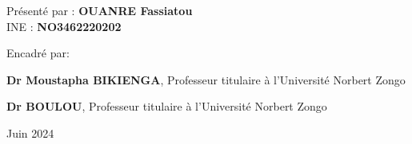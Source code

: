 \begin{titlepage}
\begin{center}
\vspace{30pt}

{\fontsize{16}{1}\selectfont Présenté par : \textbf{OUANRE Fassiatou}} \\

\vspace{0.6 cm}
 INE : \textbf{NO3462220202}
\end{center}

\vspace{30pt}
{\fontsize{16}{1}\selectfont Encadré par:}\\
\vspace{2pt}

{\fontsize{14}{1}\selectfont \textbf{Dr Moustapha BIKIENGA}}, Professeur titulaire à l'Université Norbert Zongo\\
\vspace{2pt}

{\fontsize{14}{1}\selectfont \textbf{Dr BOULOU}}, Professeur titulaire à l'Université Norbert Zongo\\
\vspace{20pt}

\begin{center}
Juin 2024
\end{center}
\end{titlepage}
